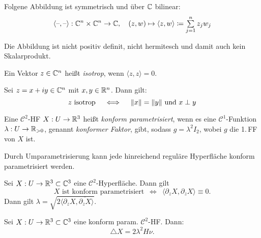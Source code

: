 \documentclass{cheat-sheet}
\begin{document}
\begin{defn}
  Folgene Abbildung ist symmetrisch und über $\mathbb{C}$ bilinear:
  \[
    \langle \blank , \blank \rangle : \C^n \times \C^n \to \C, \quad
    (z, w) \mapsto \langle z, w \rangle \coloneqq \sum_{j=1}^n z_j w_j
  \]
\end{defn}

\begin{bem}
  Die Abbildung ist nicht positiv definit, nicht hermitesch und damit auch kein Skalarprodukt.
\end{bem}

\begin{defn}
  Ein Vektor $z \in \mathbb{C}^n$ heißt \emph{isotrop}, wenn $\langle z, z \rangle = 0$.
\end{defn}


\begin{lem}
  Sei $z = x + iy \in \mathbb{C}^n$ mit $x, y \in \mathbb{R}^n$. Dann gilt:
  \[ z \text{ isotrop} \quad \iff \quad \lVert x\rVert = \lVert y\rVert \text{ und } x \perp y \]
\end{lem}


\begin{defn}
  Eine $\mathcal{C}^2$-HF $X : U \to \mathbb{R}^3$ heißt \emph{konform parametrisiert}, wenn es eine $\mathcal{C}^1$-Funktion $\lambda : U \to \mathbb{R}_{>0}$, genannt \emph{konformer Faktor}, gibt, sodass $g = \lambda^2 I_2$, wobei $g$ die 1.\,FF von $X$ ist.
\end{defn}

\begin{bem}
  Durch Umparametrisierung kann jede hinreichend reguläre Hyperfläche konform parametrisiert werden.
\end{bem}

\begin{lem}
  Sei $X : U \to \mathbb{R}^3 \subset \mathbb{C}^3$ eine $\mathcal{C}^2$-Hyperfläche. Dann gilt
  \[
    \text{$X$ ist konform parametrisiert}
    \enspace \iff \enspace
    \langle \partial_z X, \partial_z X \rangle \equiv 0.
  \]
  Dann gilt $\lambda = \sqrt{2 \langle \partial_z X , \overline{\partial_z X} \rangle}$.
\end{lem}

\begin{lem}
  Sei $X : U \to \mathbb{R}^3 \subset \mathbb{C}^3$ eine konform param. $\mathcal{C}^2$-HF. Dann:
  \[ \triangle X = 2 \lambda^2 H \nu. \]
\end{lem}
\end{document}
